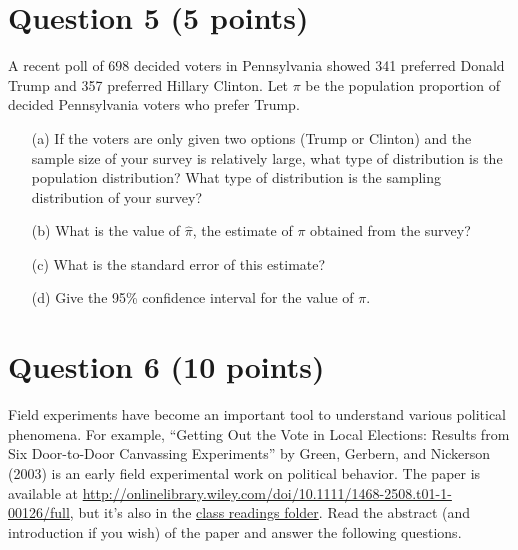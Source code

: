 \documentclass[12pt,letterpaper]{article}
\begin{document}
	\section*{Question 5 (5 points)}
	A recent poll of 698 decided voters in Pennsylvania showed 341 preferred Donald Trump and 357 preferred Hillary Clinton. Let $\pi$ be the population proportion of decided Pennsylvania voters who prefer Trump.\\
	
	\begin{itemize}
		\item[(a)] If the voters are only given two options (Trump or Clinton) and the sample size of your survey is relatively large, what type of distribution is the population distribution? What type of distribution is the sampling distribution of your survey?\\
		\vspace{11em}
		
		
		
		\item[(b)] What is the value of $\hat{\pi}$, the estimate of $\pi$ obtained from the survey?\\
		\vspace{11em}
		
		
		\item[(c)] What is the standard error of this estimate?\\
		\vspace{11em}
		
		\item[(d)] Give the 95\% confidence interval for the value of $\pi$.\\

	\end{itemize}
	
			\vspace{7em}
	\section*{Question 6 (10 points)}
Field experiments have become an important tool to understand various political phenomena. For example, ``Getting Out the Vote in Local Elections: Results from Six Door-to-Door Canvassing Experiments'' by Green, Gerbern, and Nickerson (2003) is an early field experimental work on political behavior. The paper is available at \url{http://onlinelibrary.wiley.com/doi/10.1111/1468-2508.t01-1-00126/full}, but it's also in the \href{https://drive.google.com/drive/folders/145RbI9kHmXjkqfCkPF-_UPG0rFqmiJXi}{class readings folder}. Read the abstract (and introduction if you wish) of the paper and answer the following questions. \\
\end{document}
